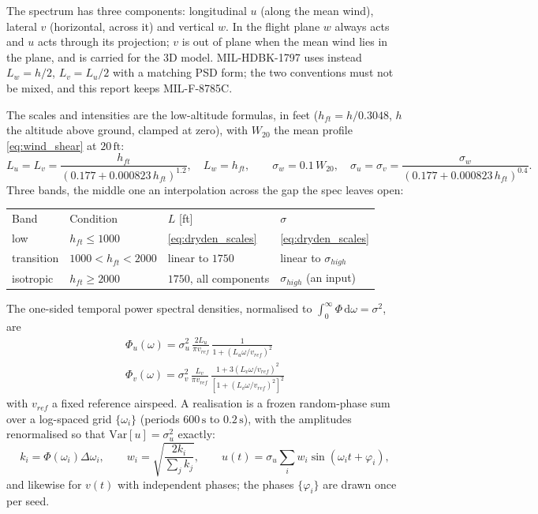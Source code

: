 The spectrum has three components: longitudinal $u$ (along the mean wind), lateral $v$ (horizontal,
across it) and vertical $w$. In the flight plane $w$ always acts and $u$ acts through its
projection; $v$ is out of plane when the mean wind lies in the plane, and is carried for the 3D
model.
MIL-HDBK-1797 uses instead $L_w=h/2$, $L_v=L_u/2$ with a matching PSD form; the two conventions
must not be mixed, and this report keeps MIL-F-8785C.

The scales and intensities are the low-altitude formulas, in feet ($h_{ft}=h/0.3048$, $h$ the
altitude above ground, clamped at zero), with $W_{20}$ the mean profile \autoref{eq:wind_shear} at
$20\,\mathrm{ft}$:
\begin{equation} \label{eq:dryden_scales}
    L_u = L_v = \frac{h_{ft}}{\left(0.177+0.000823\,h_{ft}\right)^{1.2}}, \quad L_w=h_{ft}, \qquad
    \sigma_w = 0.1\,W_{20}, \quad
    \sigma_u = \sigma_v = \frac{\sigma_w}{\left(0.177+0.000823\,h_{ft}\right)^{0.4}}.
\end{equation}
Three bands, the middle one an interpolation across the gap the spec leaves open:
\begin{center}
\begin{tabular}{l l l l}
Band & Condition & $L$ [ft] & $\sigma$ \\
low        & $h_{ft}\leq1000$      & \autoref{eq:dryden_scales} & \autoref{eq:dryden_scales} \\
transition & $1000<h_{ft}<2000$    & linear to $1750$ & linear to $\sigma_{high}$ \\
isotropic  & $h_{ft}\geq2000$      & $1750$, all components & $\sigma_{high}$ (an input) \\
\end{tabular}
\end{center}
The one-sided temporal power spectral densities, normalised to $\int_0^\infty\Phi\,\mathrm{d}\omega
=\sigma^2$, are
\begin{gather}
    \Phi_u(\omega) = \sigma_u^2\,\frac{2L_u}{\pi v_{ref}}\,\frac{1}{1+\left(L_u\omega/v_{ref}\right)^2}
        \label{eq:dryden_psd_u} \\
    \Phi_v(\omega) = \sigma_v^2\,\frac{L_v}{\pi v_{ref}}\,
        \frac{1+3\left(L_v\omega/v_{ref}\right)^2}{\left[1+\left(L_v\omega/v_{ref}\right)^2\right]^2}
        \label{eq:dryden_psd_v}
\end{gather}
with $v_{ref}$ a fixed reference airspeed. A realisation is a frozen random-phase sum over a
log-spaced grid $\{\omega_i\}$ (periods $600\,\mathrm{s}$ to $0.2\,\mathrm{s}$), with the
amplitudes renormalised so that $\mathrm{Var}[u]=\sigma_u^2$ exactly:
\begin{equation} \label{eq:dryden_synthesis}
    k_i = \Phi(\omega_i)\Delta\omega_i, \qquad
    w_i = \sqrt{\frac{2k_i}{\sum_jk_j}}, \qquad
    u(t) = \sigma_u\sum_i w_i\sin(\omega_it+\varphi_i),
\end{equation}
and likewise for $v(t)$ with independent phases; the phases $\{\varphi_i\}$ are drawn once per seed.

